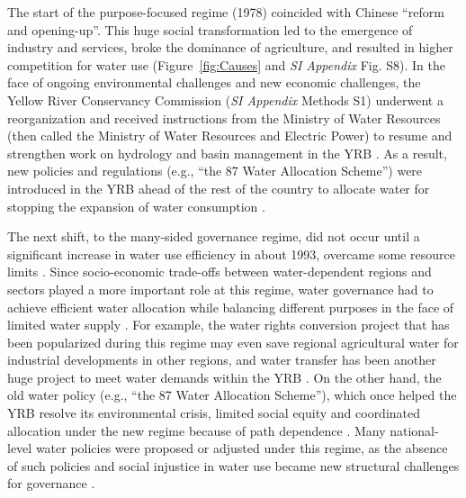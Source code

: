 \documentclass[9pt, twocolumn, twoside, lineno]{pnas-new}
\begin{document}
The start of the purpose-focused regime (1978) coincided with Chinese ``reform and opening-up''.
This huge social transformation led to the emergence of industry and services, broke the dominance of agriculture, and resulted in higher competition for water use (Figure~\ref{fig:Causes} and \textit{SI Appendix} Fig. S8). 
In the face of ongoing environmental challenges and new economic challenges, the Yellow River Conservancy Commission (\textit{SI Appendix} Methods S1) underwent a reorganization and received instructions from the Ministry of Water Resources (then called the Ministry of Water Resources and Electric Power) to resume and strengthen work on hydrology and basin management in the YRB 
\cite{yellowriverarchivesOrganizationalHistoryYellow2004}.
As a result, new policies and regulations (e.g., ``the 87 Water Allocation Scheme'') were introduced in the YRB ahead of the rest of the country to allocate water for stopping the expansion of water consumption 
\cite{wang2018}.

The next shift, to the many-sided governance regime, did not occur until a significant increase in water use efficiency in about 1993, overcame some resource limits  
\cite{liuWaterconservancyprojects2013}. 
Since socio-economic trade-offs between water-dependent regions and sectors played a more important role at this regime, water governance had to achieve efficient water allocation while balancing different purposes in the face of limited water supply  
\cite{dalinBalancingwaterresource2015}.
For example, the water rights conversion project that has been popularized during this regime may even save regional agricultural water for industrial developments in other regions, and water transfer has been another huge project to meet water demands within the YRB
\cite{barnett2015,yunpeng2010}.
On the other hand, the old water policy (e.g., ``the 87 Water Allocation Scheme''), which once helped the YRB resolve its environmental crisis, limited social equity and coordinated allocation under the new regime because of path dependence 
\cite{wang2018}.
Many national-level water policies were proposed or adjusted under this regime, as the absence of such policies and social injustice in water use became new structural challenges for governance
\cite{konarExpandingScopeFoundation2019}.
\end{document}
